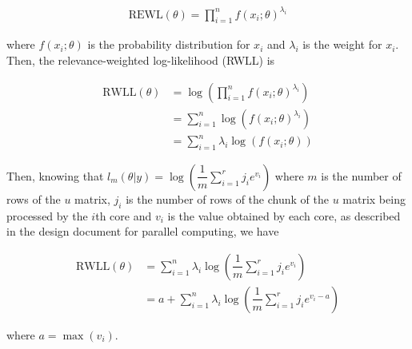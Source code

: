 \documentclass{article}
\begin{document}
\begin{align}
\text{REWL}(\theta) = \prod_{i=1}^{n} {f(x_i;\theta)}^{\lambda_i}
\end{align}

\noindent where $f(x_i;\theta)$ is the probability distribution for $x_i$ and $\lambda_i$ is the weight for $x_i$. Then, the relevance-weighted log-likelihood (RWLL) is 

\begin{align}
\text{RWLL}(\theta) &= \log\left(\prod_{i=1}^{n} {f(x_i;\theta)}^{\lambda_i}\right) \\
&= \sum_{i=1}^{n} \log\left({f(x_i;\theta)}^{\lambda_i}\right) \\
&= \sum_{i=1}^{n} \lambda_i \log\left(f(x_i;\theta)\right)
\end{align}

Then, knowing that $l_m(\theta | y) = \log\left(\dfrac{1}{m}\sum_{i=1}^{r}j_ie^{v_i}\right)$ where $m$ is the number of rows of the $u$ matrix, $j_i$ is the number of rows of the chunk of the $u$ matrix being processed by the $i$th core and $v_i$ is the value obtained by each core, as described in the design document for parallel computing, we have 

\begin{align}
\text{RWLL}(\theta) &= \sum_{i=1}^{n} \lambda_i \log\left(\dfrac{1}{m}\sum_{i=1}^{r}j_ie^{v_i}\right) \\
&= a + \sum_{i=1}^{n} \lambda_i \log\left(\dfrac{1}{m}\sum_{i=1}^{r}j_ie^{v_i - a}\right)
\end{align}

\noindent where $a = \max(v_i)$.
\end{document}
